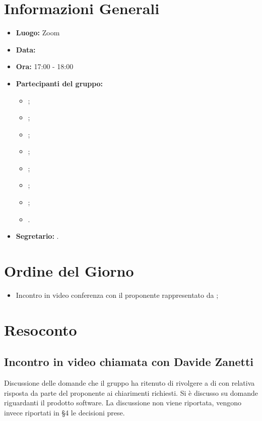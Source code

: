 \section{Informazioni Generali}
\begin{itemize}
	\item \textbf{Luogo:} Zoom
	\item \textbf{Data:} \Data
	\item \textbf{Ora:} 17:00 - 18:00
	\item \textbf{Partecipanti del gruppo:}
	\begin{itemize}
		\item \AT{};
		\item \BR{};  
		\item \CE{}; 
		\item \DF{};
		\item \LD{};
		\item \MC{};
		\item \PF{};
		\item \SE{}.
	\end{itemize} 
	\item \textbf{Segretario:} \BR{}.
\end{itemize}

\section{Ordine del Giorno}
\begin{itemize}
	\item Incontro in video conferenza con il proponente \Proponente{} rappresentato da \ZD{};
\end{itemize}

\section{Resoconto}

\subsection{Incontro in video chiamata con Davide Zanetti}
Discussione delle domande che il gruppo ha ritenuto di rivolgere a \ZD{} di \Proponente{} con relativa risposta da parte del proponente ai chiarimenti richiesti. Si è discusso su domande riguardanti il prodotto software.
La discussione non viene riportata, vengono invece riportati in §4 le decisioni prese.

\clearpage